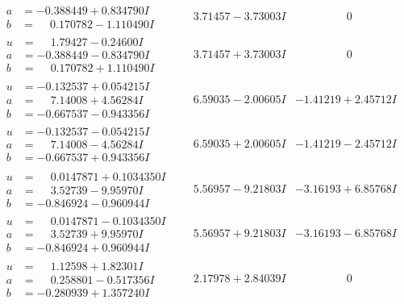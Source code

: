 \documentclass[1p]{elsarticle_modified}
\theoremstyle{definition}
\begin{document}
$$\begin{array}{c|c|c}
\begin{aligned}
a &= -0.388449 + 0.834790 I \\
b &= \phantom{-}0.170782 - 1.110490 I\end{aligned}
 & \phantom{-}3.71457 - 3.73003 I & \phantom{-0.000000 } 0 \\ \hline\begin{aligned}
u &= \phantom{-}1.79427 - 0.24600 I \\
a &= -0.388449 - 0.834790 I \\
b &= \phantom{-}0.170782 + 1.110490 I\end{aligned}
 & \phantom{-}3.71457 + 3.73003 I & \phantom{-0.000000 } 0 \\ \hline\begin{aligned}
u &= -0.132537 + 0.054215 I \\
a &= \phantom{-}7.14008 + 4.56284 I \\
b &= -0.667537 - 0.943356 I\end{aligned}
 & \phantom{-}6.59035 - 2.00605 I & -1.41219 + 2.45712 I \\ \hline\begin{aligned}
u &= -0.132537 - 0.054215 I \\
a &= \phantom{-}7.14008 - 4.56284 I \\
b &= -0.667537 + 0.943356 I\end{aligned}
 & \phantom{-}6.59035 + 2.00605 I & -1.41219 - 2.45712 I \\ \hline\begin{aligned}
u &= \phantom{-}0.0147871 + 0.1034350 I \\
a &= \phantom{-}3.52739 - 9.95970 I \\
b &= -0.846924 - 0.960944 I\end{aligned}
 & \phantom{-}5.56957 - 9.21803 I & -3.16193 + 6.85768 I \\ \hline\begin{aligned}
u &= \phantom{-}0.0147871 - 0.1034350 I \\
a &= \phantom{-}3.52739 + 9.95970 I \\
b &= -0.846924 + 0.960944 I\end{aligned}
 & \phantom{-}5.56957 + 9.21803 I & -3.16193 - 6.85768 I \\ \hline\begin{aligned}
u &= \phantom{-}1.12598 + 1.82301 I \\
a &= \phantom{-}0.258801 - 0.517356 I \\
b &= -0.280939 + 1.357240 I\end{aligned}
 & \phantom{-}2.17978 + 2.84039 I & \phantom{-0.000000 } 0 \\ \hline\begin{aligned}

\end{aligned}
\end{array}$$
\end{document}

